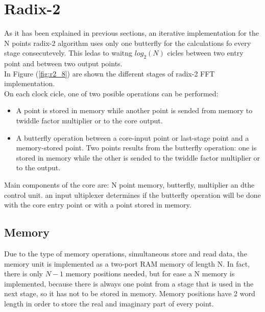 \documentclass[conference]{IEEEtran}
\begin{document}
\section{Radix-2}

As it has been explained in previous sections, an iterative implementation for the N points radix-2 algorithm uses only one butterfly 
for the calculations fo every stage consecutevely. This ledas to waitng $log_2(N)$ cicles between two entry point and between two output points.\\
In Figure (\ref{fig:r2_8}) are shown the different stages of radix-2 FFT implementation.\\
On each clock cicle, one of two posible operations can be performed:

\begin{itemize}
  \item A point is stored in memory while another point is sended from memory to twiddle factor multiplier or to the core output.
  \item A butterfly operation between a core-input point or last-stage point and a memory-stored point. Two points results from the
  butterfly operation: one is stored in memory while the other is sended to the twiddle factor multiplier or to the output.  
\end{itemize}

Main components of the core are: N point memory, butterfly, multiplier an dthe control unit. an input ultiplexer determines if the 
butterfly operation will be done with the core entry point or with a point stored in memory.\\


\subsection{Memory}

Due to the type of memory operations, simultaneous store and read data, the memory unit is implemented as a two-port RAM memory of length N. 
In fact, there is only $N-1$ memory positions needed, but for ease a N memory is implemented, because there is always one point from a stage that is used in 
the next stage, so it has not to be stored in memory. Memory positions have 2 word length in order to store the real and imaginary part of every point.
\end{document}
